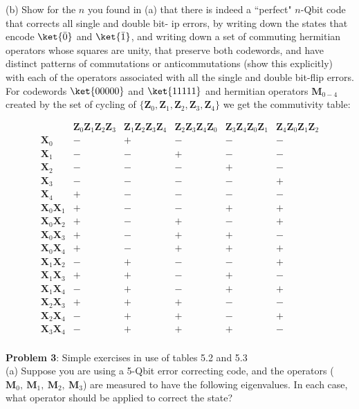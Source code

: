 (b) Show for the $n$ you found in (a) that there is indeed a ``perfect" $n$-Qbit
code that
corrects all single and double bit-
ip errors, by writing down the states that encode $\ket{\bar{0}}$ and
$\ket{\bar{1}}$, and writing down a set of commuting hermitian operators whose squares
are unity, that
preserve both codewords, and have distinct patterns of commutations or
anticommutations
(show this explicitly) with each of the operators associated with all the
single and double
bit-flip errors.\\

For codewords $\ket{00000}$ and $\ket{11111}$ and hermitian operators
$\textbf{M}_{0-4}$ created by the set of cycling of
$\{\textbf{Z}_0,\textbf{Z}_1,\textbf{Z}_2,\textbf{Z}_3,\textbf{Z}_4\}$ we get
the commutivity table:

$$\begin{array}{cccccc}
 & \textbf{Z}_0\textbf{Z}_1\textbf{Z}_2\textbf{Z}_3 &
 \textbf{Z}_1\textbf{Z}_2\textbf{Z}_3\textbf{Z}_4 &
 \textbf{Z}_2\textbf{Z}_3\textbf{Z}_4\textbf{Z}_0 &
 \textbf{Z}_3\textbf{Z}_4\textbf{Z}_0\textbf{Z}_1 &
 \textbf{Z}_4\textbf{Z}_0\textbf{Z}_1\textbf{Z}_2\\
 \textbf{X}_0 & - & + & - & - & -\\
 \textbf{X}_1 & - & - & + & - & -\\
 \textbf{X}_2 & - & - & - & + & -\\
 \textbf{X}_3 & - & - & - & - & +\\
 \textbf{X}_4 & + & - & - & - & -\\
 \textbf{X}_0\textbf{X}_1 & + & - & - & + & +\\
 \textbf{X}_0\textbf{X}_2 & + & - & + & - & +\\
 \textbf{X}_0\textbf{X}_3 & + & - & + & + & -\\
 \textbf{X}_0\textbf{X}_4 & + & - & + & + & +\\
 \textbf{X}_1\textbf{X}_2 & - & + & - & - & +\\
 \textbf{X}_1\textbf{X}_3 & + & + & - & + & -\\
 \textbf{X}_1\textbf{X}_4 & - & + & - & + & +\\
 \textbf{X}_2\textbf{X}_3 & + & + & + & - & -\\
 \textbf{X}_2\textbf{X}_4 & - & + & + & - & +\\
 \textbf{X}_3\textbf{X}_4 & - & + & + & + & -\\
 \end{array}$$


 \textbf{Problem 3}: Simple exercises in use of tables 5.2 and 5.3\\
 (a) Suppose you are using a 5-Qbit error correcting code, and the
 operators ($\textbf{M}_0,~\textbf{M}_1,~\textbf{M}_2,~\textbf{M}_3$) are
 measured to have the following eigenvalues. In each case, what operator
 should be applied to correct the state?\\

